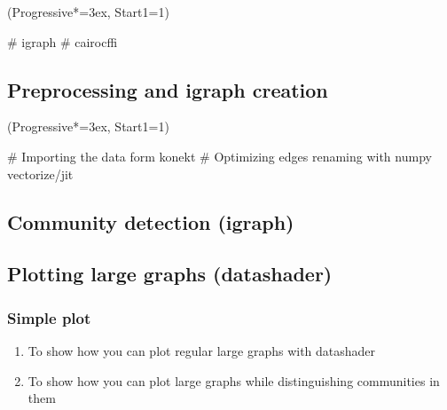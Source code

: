 \documentclass[12pt, a4paper]{article}
\let\OldEasylist\easylist
\let\OldEndEasylist\endeasylist
\renewenvironment{easylist}{%
    \OldEasylist%
    \ListProperties(Progressive*=3ex, Start1=1)%
}{%
    \OldEndEasylist%
}%
\begin{document}
\begin{easylist}
  # igraph
  # cairocffi
\end{easylist}

\newpage
\subsection{Preprocessing and igraph creation}
\begin{easylist}
# Importing the data form konekt
# Optimizing edges renaming with numpy vectorize/jit
\end{easylist}

\newpage
\subsection{Community detection (igraph)}

\newpage
\subsection{Plotting large graphs (datashader)}
\subsubsection{Simple plot}

\begin{enumerate}
  \item To show how you can plot regular large graphs with datashader
  \item To show how you can plot large graphs while distinguishing communities in them
\end{enumerate}

\end{document}
